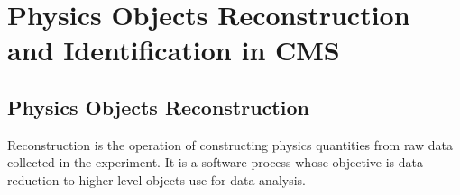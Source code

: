\chapter{Physics Objects Reconstruction and Identification in CMS}
\label{Reconstruction_and Particle_ID_chapter}
\section{Physics Objects Reconstruction}
Reconstruction is the operation of constructing physics quantities from raw data collected in the experiment. It is a software process whose objective is data reduction to higher-level objects use for data analysis.
